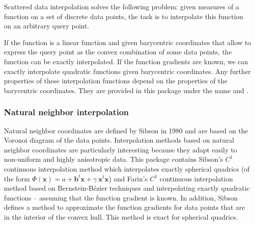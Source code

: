 

Scattered data interpolation solves the following problem: given
measures of a function on a set of discrete data points, the task is
to interpolate this function on an arbitrary query point.

If the function is a linear function and given barycentric coordinates
that allow to express the query point as the convex combination of
some data points, the function can be exactly interpolated. If the
function gradients are known, we can exactly interpolate quadratic
functions given barycentric coordinates. Any further properties of
these interpolation functions depend on the properties of the
barycentric coordinates. They are provided in this package under the
name  and
.\medskip

\subsubsection*{Natural neighbor interpolation} 

Natural neighbor
coordinates are defined by Sibson in 1980 and are based on the Voronoi
diagram of the data points. Interpolation methods based on natural
neighbor coordinates are particularly interesting because they adapt
easily to non-uniform and highly anisotropic data.  This package
contains Sibson's $C^1$ continuous interpolation method which
interpolates exactly spherical quadrics (of the form $\Phi(\mathbf{x})
=a + \mathbf{b}^t \mathbf{x} +\gamma\ \mathbf{x}^t\mathbf{x}$) and
Farin's $C^1$ continuous interpolation method based on
Bernstein-B\'ezier techniques and interpolating exactly quadratic
functions -- assuming that the function gradient is known. In
addition, Sibson defines a method to approximate the function
gradients for data points that are in the interior of the convex hull.
This
method is exact for spherical quadrics.%

